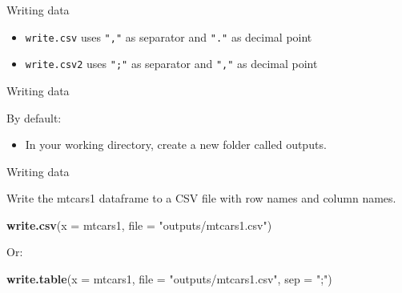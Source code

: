 \documentclass[ignorenonframetext,]{beamer}
\newenvironment{Shaded}{\begin{snugshade}}{\end{snugshade}}
\newcommand{\DataTypeTok}[1]{\textcolor[rgb]{0.13,0.29,0.53}{#1}}
\newcommand{\KeywordTok}[1]{\textcolor[rgb]{0.13,0.29,0.53}{\textbf{#1}}}
\newcommand{\NormalTok}[1]{#1}
\newcommand{\StringTok}[1]{\textcolor[rgb]{0.31,0.60,0.02}{#1}}
\providecommand{\tightlist}{%
  \setlength{\itemsep}{0pt}\setlength{\parskip}{0pt}}
\begin{document}
\begin{frame}[fragile]{Writing data}
\protect\hypertarget{writing-data-4}{}

\begin{itemize}
\item
  \texttt{write.csv} uses \texttt{","} as separator and \texttt{"."} as
  decimal point
\item
  \texttt{write.csv2} uses \texttt{";"} as separator and \texttt{","} as
  decimal point
\end{itemize}

\end{frame}

\begin{frame}{Writing data}
\protect\hypertarget{writing-data-5}{}

By default:

\begin{itemize}
\tightlist
\item
  In your working directory, create a new folder called outputs.
\end{itemize}

\end{frame}

\begin{frame}[fragile]{Writing data}
\protect\hypertarget{writing-data-6}{}

Write the mtcars1 dataframe to a CSV file with row names and column
names.

\begin{Shaded}
\begin{Highlighting}[]
\KeywordTok{write.csv}\NormalTok{(}\DataTypeTok{x =}\NormalTok{ mtcars1,}
          \DataTypeTok{file =} \StringTok{"outputs/mtcars1.csv"}\NormalTok{)}
\end{Highlighting}
\end{Shaded}

Or:

\begin{Shaded}
\begin{Highlighting}[]
\KeywordTok{write.table}\NormalTok{(}\DataTypeTok{x =}\NormalTok{ mtcars1, }
            \DataTypeTok{file =} \StringTok{"outputs/mtcars1.csv"}\NormalTok{,}
            \DataTypeTok{sep =} \StringTok{";"}\NormalTok{)}
\end{Highlighting}
\end{Shaded}

\end{frame}
\end{document}
